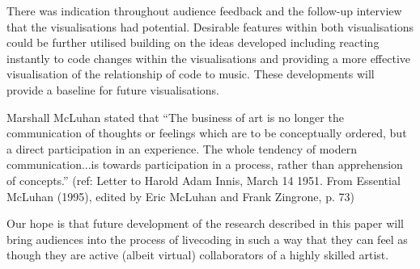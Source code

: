 \documentclass{sig-alternate}
\begin{document}
There was indication throughout audience feedback and the follow-up interview that the visualisations had potential. Desirable features within both visualisations could be further utilised building on the ideas developed including reacting instantly to code changes within the visualisations and providing a more effective visualisation of the relationship of code to music. These developments will provide a baseline for future visualisations.

Marshall McLuhan stated that ``The business of art is no longer the communication of thoughts or feelings which are to be conceptually ordered, but a direct participation in an experience. The whole tendency of modern communication...is towards participation in a process, rather than apprehension of concepts.'' (ref: Letter to Harold Adam Innis, March 14 1951. From Essential McLuhan (1995), edited by Eric McLuhan and Frank Zingrone, p. 73)

Our hope is that future development of the research described in this paper will bring audiences into the process of livecoding in such a way that they can feel as though they are active (albeit virtual) collaborators of a highly skilled artist.

\nocite{*} %


%

\end{document}

